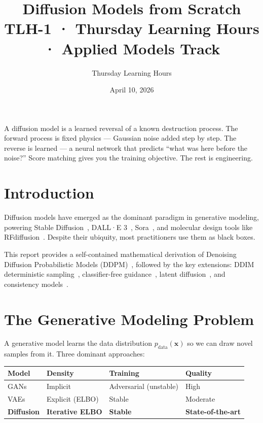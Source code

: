 \documentclass[11pt, a4paper]{article}
\title{%
  \color{copper}\textbf{Diffusion Models from Scratch}\\[4pt]
  \large TLH-1 · Thursday Learning Hours · Applied Models Track
}
\author{Thursday Learning Hours}
\date{April 10, 2026}
\theoremstyle{definition}
\newcommand{\bx}{\bm{x}}
\begin{document}
\maketitle

\begin{tcolorbox}[colback=ivory, colframe=copper, title=\textbf{Session Core Thesis}]
A diffusion model is a learned reversal of a known destruction process. The forward process is
fixed physics — Gaussian noise added step by step. The reverse is learned — a neural network
that predicts ``what was here before the noise?'' Score matching gives you the training
objective. The rest is engineering.
\end{tcolorbox}

\tableofcontents
\newpage

\section{Introduction}

Diffusion models have emerged as the dominant paradigm in generative modeling, powering
Stable Diffusion~\cite{rombach2022ldm}, DALL·E 3~\cite{ramesh2022dalle2},
Sora~\cite{brooks2024sora}, and molecular design tools like
RFdiffusion~\cite{watson2022rfdiffusion}. Despite their ubiquity, most practitioners use them
as black boxes.

This report provides a self-contained mathematical derivation of Denoising Diffusion
Probabilistic Models (DDPM)~\cite{ho2020ddpm}, followed by the key extensions: DDIM
deterministic sampling~\cite{song2020ddim}, classifier-free guidance~\cite{ho2021cfg},
latent diffusion~\cite{rombach2022ldm}, and consistency models~\cite{song2023consistency}.

\section{The Generative Modeling Problem}

A generative model learns the data distribution $p_\mathrm{data}(\bx)$ so we can draw novel
samples from it. Three dominant approaches:

\begin{center}
\begin{tabular}{llll}
\toprule
Model & Density & Training & Quality \\
\midrule
GANs & Implicit & Adversarial (unstable) & High \\
VAEs & Explicit (ELBO) & Stable & Moderate \\
\textbf{Diffusion} & \textbf{Iterative ELBO} & \textbf{Stable} & \textbf{State-of-the-art} \\
\bottomrule
\end{tabular}
\end{center}
\end{document}

